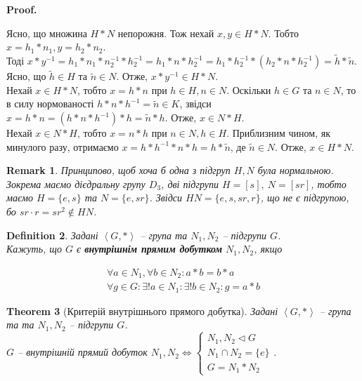 \documentclass[a4paper, 10pt]{article}
\makeatletter
\theoremstyle{theoremdd}
\newtheorem{theorem}{Theorem}[subsection]
\theoremstyle{theoremdd}
\newtheorem{definition}[theorem]{Definition}
\theoremstyle{theoremdd}
\theoremstyle{theoremdd}
\theoremstyle{theoremdd}
\theoremstyle{theoremdd}
\theoremstyle{theoremdd}
\theoremstyle{theoremdd}
\theoremstyle{theoremdd}
\theoremstyle{theoremdd}
\theoremstyle{theoremdd}
\newtheorem{remark}[theorem]{Remark}
\theoremstyle{theoremdd}
\theoremstyle{theoremdd}
\theoremstyle{theoremdd}
\theoremstyle{theoremdd}
\renewenvironment{proof}[1][Proof.\\]{\par
\pushQED{\hfill \qed}%
\normalfont \topsep6\p@\@plus6\p@\relax
\trivlist
\item\relax
{\bfseries
#1\@addpunct{.}}\hspace\labelsep\ignorespaces
}{%
\popQED\endtrivlist\@endpefalse
}
\makeatother
\begin{document}
\begin{proof}
Ясно, що множина $H*N$ непорожня. Тож нехай $x,y \in H*N$. Тобто $x = h_1*n_1, y = h_2*n_2$.\\
Тоді $x*y^{-1} = h_1*n_1*n_2^{-1}*h_2^{-1} = h_1*n*h_2^{-1} = h_1*h_2^{-1} *(h_2*n*h_2^{-1})= \tilde{h}*\tilde{n}$.\\
Ясно, що $\tilde{h} \in H$ та $\tilde{n} \in N$. Отже, $x*y^{-1} \in H*N$.
\bigskip \\
Нехай $x \in H*N$, тобто $x = h*n$ при $h \in H, n \in N$. Оскільки $h \in G$ та $n \in N$, то в силу нормованості $h*n*h^{-1} = \tilde{n} \in K$, звідси $x = h*n = (h*n*h^{-1})*h = \tilde{n}*h$. Отже, $x \in N*H$.\\
Нехай $x \in N*H$, тобто $x = n*h$ при $n \in N, h \in H$. Приблизним чином, як минулого разу, отримаємо $x = h*h^{-1}*n*h = h*\tilde{n}$, де $\tilde{n} \in N$. Отже, $x \in H*N$.
\end{proof}

\begin{remark}
Принципово, щоб хоча б одна з підгруп $H,N$ була нормальною.\\
Зокрема маємо дієдральну групу $D_3$, дві підгрупи $H = [s],\ N =[sr]$, тобто маємо $H = \{e,s\}$ та $N = \{e, sr\}$. Звідси $HN = \{e,s,sr,r\}$, що не є підгрупою, бо $sr \cdot r = sr^2 \notin HN$.
\end{remark}

\begin{definition}
Задані $\left<G, *\right>$  -- група та $N_1,N_2$ -- підгрупи $G$.\\
Кажуть, що $G$ є \textbf{внутрішнім прямим добутком} $N_1,N_2$, якщо
\iffalse
\begin{align*}
N_1 \cap N_2 = \{e\} \\
G = N_1*N_2
\end{align*}
\fi
\begin{align*}
\forall a \in N_1, \forall b \in N_2: a*b = b*a \\
\forall g \in G: \exists !a \in N_1: \exists !b \in N_2: g = a*b
\end{align*}
\end{definition}

\begin{theorem}[Критерій внутрішнього прямого добутка]
Задані $\left<G, *\right>$  -- група та та $N_1,N_2$ -- підгрупи $G$.\\
$G$ -- внутрішній прямий добуток $N_1,N_2 \iff \begin{cases} N_1, N_2 \triangleleft G \\ N_1 \cap N_2 = \{e\} \\ G = N_1*N_2 \end{cases}$.
\end{theorem}
\end{document}
